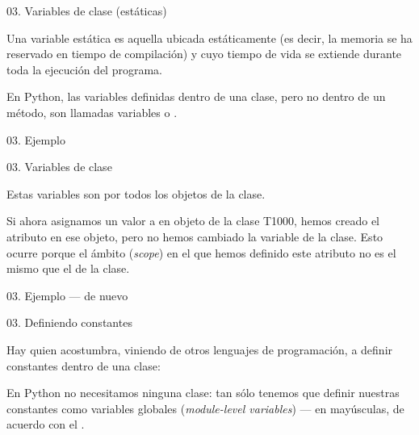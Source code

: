 
\begin{frame}{03. Variables de clase (estáticas)}
  \begin{center}
    Una variable estática es aquella ubicada estáticamente (es decir,
    la memoria se ha reservado en tiempo de compilación) y cuyo tiempo
    de vida se extiende durante toda la ejecución del programa.
  \end{center}

  \begin{block}{}
    \centering En Python, las variables definidas dentro de una clase,
    pero no dentro de un método, son llamadas variables
     o .
  \end{block}
\end{frame}

\begin{frame}{03. Ejemplo}
  \small
\end{frame}

\begin{frame}{03. Variables de clase}
  \begin{block}{}
    \large
    \centering
    Estas variables son  por todos los objetos
    de la clase.
  \end{block}

  \begin{justify}
    \small
    Si ahora asignamos un valor a  en objeto de la
    clase T1000, hemos creado el atributo en ese objeto, pero no hemos
    cambiado la variable de la clase. Esto ocurre porque el ámbito
    (\textit{scope}) en el que hemos definido este atributo no es el
    mismo que el de la clase.
  \end{justify}
\end{frame}

\begin{frame}{03. Ejemplo — de nuevo}
  \small
\end{frame}

\begin{frame}{03. Definiendo constantes}
  \small
  \begin{center}
    Hay quien acostumbra, viniendo de otros lenguajes de programación,
    a definir constantes dentro de una clase:
  \end{center}


  \begin{block}{}
    \centering
    En Python no necesitamos ninguna clase: tan sólo tenemos que
    definir nuestras constantes como variables globales
    (\textit{module-level variables}) — en mayúsculas, de acuerdo con
    el .
  \end{block}
\end{frame}

